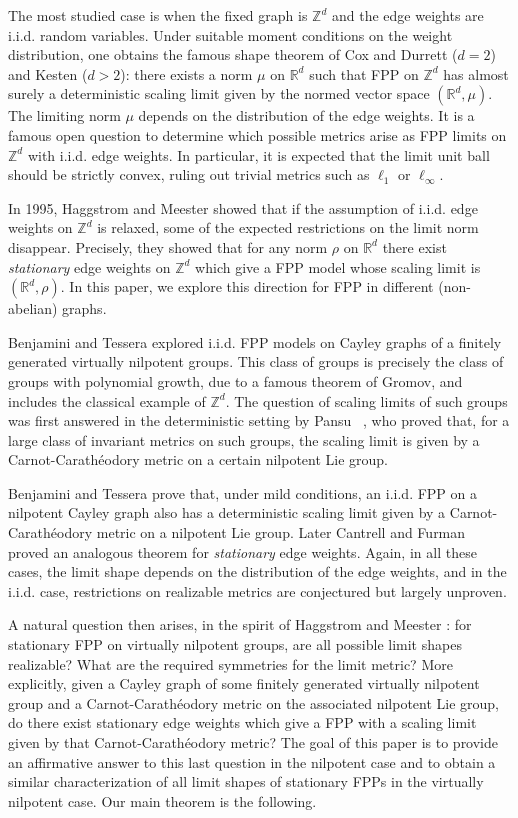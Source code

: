 \documentclass[12pt,reqno]{article}
\numberwithin{equation}{section}
\newcommand{\R}{\mathbb{R}}
\newcommand{\Z}{\mathbb{Z}}
\begin{document}
The most studied case is when the fixed graph is $\Z^d$ and the edge weights are i.i.d. random variables. Under suitable moment conditions on the weight distribution, one obtains the famous shape theorem of Cox and Durrett ($d=2$) \cite{CD} and Kesten ($d>2$)\cite{Aspects}: there exists a norm $\mu$ on $\mathbb R^{d}$ such that FPP on $\Z^d$ has almost surely a deterministic scaling limit given by the normed vector space $(\mathbb R^d, \mu)$. The limiting norm $\mu$ depends on the distribution of the edge weights. It is a famous open question to determine which possible metrics arise as FPP limits on $\Z^d$ with i.i.d. edge weights. In particular, it is expected that the limit unit ball should be strictly convex, ruling out trivial metrics such as $\ell_{1}$ or $\ell_{\infty}$. 


In 1995, Haggstrom and Meester\cite{HaggstromMeester} showed that if the assumption of i.i.d. edge weights on $\mathbb Z^{d}$ is relaxed, some of the expected restrictions on the limit norm disappear. Precisely, they showed that for any norm $\rho$ on $\R^d$ there exist \emph{stationary} edge weights on $\Z^d$ which give a FPP model whose scaling limit is $(\R^d, \rho)$. In this paper, we explore this direction for FPP in different (non-abelian) graphs.

Benjamini and Tessera\cite{BenjaminiTessera} explored i.i.d. FPP models on Cayley graphs of a finitely generated virtually nilpotent groups. This class of groups is precisely the class of groups with polynomial growth, due to a famous theorem of Gromov, and includes the classical example of $\Z^d$.
The question of scaling limits of such groups was first answered in the deterministic setting by Pansu ~\cite{Pansu}, who proved that, for a 
large class of invariant metrics on such groups, the scaling limit is given by a Carnot-Carath\'eodory metric on a certain nilpotent Lie group. 

Benjamini and Tessera prove that, under mild conditions, an i.i.d. FPP on a nilpotent Cayley graph also has a deterministic scaling limit given
by a Carnot-Carath\'eodory metric on a nilpotent Lie group.
Later  Cantrell and Furman ~\cite{CantrellFurman} proved an analogous theorem for \emph{stationary} edge weights.
Again, in all these cases, the limit shape depends on the distribution of the edge weights, and in the i.i.d. case, restrictions on realizable metrics
are conjectured but largely unproven.



A natural question then arises, in the spirit of Haggstrom and Meester \cite{HaggstromMeester} : for stationary FPP on virtually nilpotent groups, are all possible limit shapes realizable? What are the required symmetries for the limit metric? More explicitly, given a Cayley graph of some finitely generated virtually nilpotent group and a Carnot-Carath\'eodory metric on the associated nilpotent Lie group, 
do there exist stationary edge weights which give a FPP with a scaling limit given by that Carnot-Carath\'eodory metric?
The goal of this paper is to provide an affirmative answer to this last question in the nilpotent case and to obtain a similar characterization of all limit shapes of stationary FPPs in the virtually nilpotent case. Our main theorem is the following.
\end{document}
